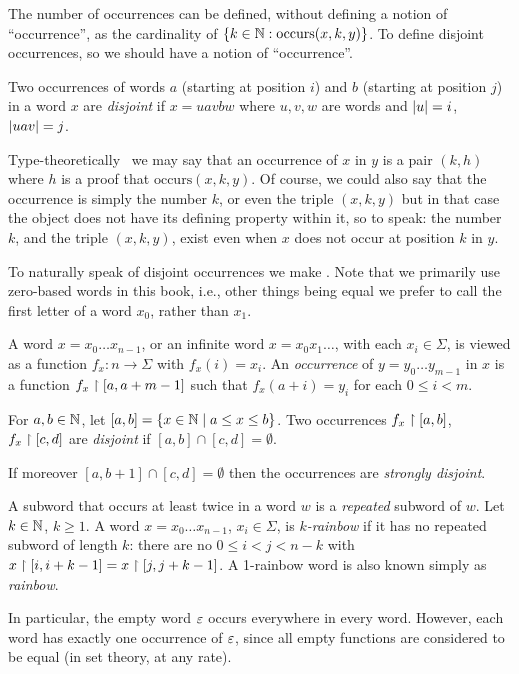 		The number of occurrences can be defined, without defining a notion of ``occurrence'', as the cardinality of
		$\{k\in\mathbb{N}: \mathrm{occurs}(x,k,y)\}$.
		To define disjoint occurrences, so we should have a notion of ``occurrence''.
		\begin{definition}\label{df:disjoint-occurrence}
			Two occurrences of words $a$ (starting at position $i$) and $b$ (starting at position $j$) in a word $x$ are \emph{disjoint} if
			$x=uavbw$ where $u,v,w$ are words and $\lvert u\rvert=i$, $\lvert uav\rvert=j$.
		\end{definition}
		Type-theoretically~\cite{MR935892} we may say that an occurrence of $x$ in $y$ is a pair $(k,h)$
		where $h$ is a proof that $\mathrm{occurs}(x,k,y)$. Of course, we could also say that the occurrence is simply the number $k$,
		or even the triple $(x,k,y)$ but in that case the object does not have its defining property within it, so to speak:
		the number $k$, and the triple $(x,k,y)$, exist even when $x$ does not occur at position $k$ in $y$.

		To naturally speak of disjoint occurrences we make . Note that we primarily use zero-based words
		in this book, i.e.,
		other things being equal we prefer to call the first letter of a word $x_0$, rather than $x_1$.
		\begin{definition}\label{df:occ}\label{word-as-permutation}
			A word $x=x_0\dots x_{n-1}$, or an infinite word $x=x_0x_1\dots$, with each $x_i\in\Sigma$, is viewed as a function $f_x:n\to\Sigma$ with $f_x(i)=x_i$.
			An \emph{occurrence} of $y=y_0\dots y_{m-1}$ in $x$ is a function
			$f_x\upharpoonright [a,a+m-1]$ such that $f_x(a+i)=y_i$ for each $0\le i< m$.

			For $a,b\in\mathbb{N}$, let $[a,b]=\{x\in\mathbb{N}\mid a\le x\le b\}$.
			Two occurrences $f_x\upharpoonright [a,b]$, $f_x\upharpoonright [c,d]$ are \emph{disjoint} if $[a,b]\cap [c,d]=\emptyset$.


			If moreover $[a,b+1]\cap [c,d]=\emptyset$ then
			the occurrences are
			\emph{strongly disjoint}.

			A subword that occurs at least twice in a word $w$ is a \emph{repeated} subword of $w$.
			Let $k\in\mathbb{N}$, $k\ge 1$.
			A word $x=x_0\dots x_{n-1}$, $x_i\in\Sigma$, is \emph{$k$-rainbow} if it has no repeated subword of length $k$:
			there are no $0\le i<j<n-k$ with $x\upharpoonright [i,i+k-1]=x\upharpoonright [j,j+k-1]$.
			A 1-rainbow word is also known simply as \emph{rainbow}.
		\end{definition}
		In particular, the empty word $\varepsilon$ occurs everywhere in every word.
		However, each word has exactly one occurrence of $\varepsilon$, since all empty functions are
		considered to be equal (in set theory, at any rate).

